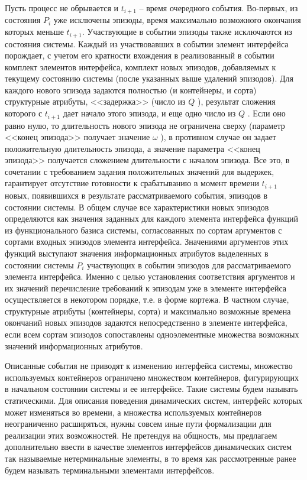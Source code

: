 Пусть процесс не обрывается и $ t_{i+1} $  – время очередного события. 
Во-первых, из состояния $ P_i $ уже исключены эпизоды, время максимально возможного окончания которых меньше $ t_{i+1} $. 
Участвующие в событии эпизоды также исключаются из состояния системы. 
Каждый из участвовавших в событии элемент интерфейса порождает, с учетом его кратности вхождения в реализованный в событии комплект элементов интерфейса, комплект новых эпизодов, добавляемых к текущему состоянию системы (после указанных выше удалений эпизодов). 
Для каждого нового эпизода задаются полностью (и контейнеры, и сорта) структурные атрибуты, <<задержка>> (число из $ Q $ ), результат сложения которого с  $ t_{i+1} $  дает начало этого эпизода, и еще одно число из $ Q $ . 
Если оно равно нулю, то длительность нового эпизода не ограничена сверху (параметр <<конец эпизода>> получает значение $ \omega $ ), в противном случае он задает положительную длительность эпизода, а значение параметра <<конец эпизода>> получается сложением длительности с началом эпизода. 
Все это, в сочетании с требованием задания положительных значений для выдержек, гарантирует отсутствие готовности к срабатыванию в момент времени $ t_{i+1} $ новых, появившихся в результате рассматриваемого события, эпизодов в состоянии системы. 
В общем случае все характеристики новых эпизодов определяются как значения заданных для каждого элемента интерфейса функций из функционального базиса системы, согласованных по сортам аргументов с сортами входных эпизодов элемента интерфейса. 
Значениями аргументов этих функций выступают значения информационных атрибутов выделенных в состоянии системы $ P_i $ участвующих в событии эпизодов для рассматриваемого элемента интерфейса. 
Именно с целью установления соответствия аргументов и их значений перечисление требований к эпизодам уже в элементе интерфейса осуществляется в некотором порядке, т.е. в форме кортежа. 
В частном случае, структурные атрибуты (контейнеры, сорта) и максимально возможные времена окончаний новых эпизодов задаются непосредственно в элементе интерфейса, если всем сортам эпизодов сопоставлены одноэлементные множества возможных значений информационных атрибутов. 

Описанные события не приводят к изменению интерфейса системы, множество используемых контейнеров ограничено множеством контейнеров, фигурирующих в начальном состоянии системы и ее интерфейсе. 
Такие системы будем называть статическими. 
Для описания поведения динамических систем, интерфейс которых может изменяться во времени, а множества используемых контейнеров неограниченно расширяться, нужны совсем иные пути формализации для реализации этих возможностей. 
Не претендуя на общность, мы предлагаем дополнительно ввести в качестве элементов интерфейсов динамических систем так называемые нетерминальные элементы, в то время как рассмотренные ранее будем называть терминальными элементами интерфейсов. 


